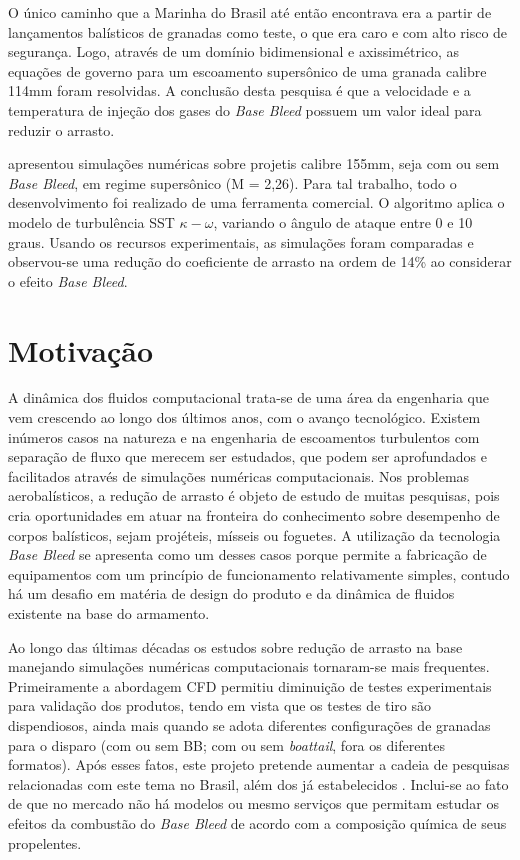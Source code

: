 O único caminho que a Marinha do Brasil até então encontrava era a partir de lançamentos balísticos de granadas como teste, o que era caro e com alto risco de segurança. Logo, através de um domínio bidimensional e axissimétrico, as equações de governo para um escoamento supersônico de uma granada calibre 114mm foram resolvidas. A conclusão desta pesquisa é que a velocidade e a temperatura de injeção dos gases do \textit{Base Bleed} possuem um valor ideal para reduzir o arrasto.

\citeauthor{Reddy2021} apresentou simulações numéricas sobre projetis calibre 155mm, seja com ou sem \textit{Base Bleed}, em regime supersônico (M = 2,26). Para tal trabalho, todo o desenvolvimento foi realizado de uma ferramenta comercial. O algoritmo aplica o modelo de turbulência SST $\kappa-\omega$, variando o ângulo de ataque entre 0 e 10 graus. Usando os recursos experimentais, as simulações foram comparadas e observou-se uma redução do coeficiente de arrasto na ordem de 14\% ao considerar o efeito \textit{Base Bleed}. 

\section{Motivação}

A dinâmica dos fluidos computacional trata-se de uma área da engenharia que vem crescendo ao longo dos últimos anos, com o avanço tecnológico. Existem inúmeros casos na natureza e na engenharia de escoamentos turbulentos com separação de fluxo que merecem ser estudados, que podem ser aprofundados e facilitados através de simulações numéricas computacionais. Nos problemas aerobalísticos, a redução de arrasto é objeto de estudo de muitas pesquisas, pois cria oportunidades em atuar na fronteira do conhecimento sobre desempenho de corpos balísticos, sejam projéteis, mísseis ou foguetes. A utilização da tecnologia \textit{Base Bleed} se apresenta como um desses casos porque permite a fabricação de equipamentos com um princípio de funcionamento relativamente simples, contudo há um desafio em matéria de design do produto e da dinâmica de fluidos existente na base do armamento.

Ao longo das últimas décadas os estudos sobre redução de arrasto na base manejando simulações numéricas computacionais tornaram-se mais frequentes. Primeiramente a abordagem CFD permitiu diminuição de testes experimentais para validação dos produtos, tendo em vista que os testes de tiro são dispendiosos, ainda mais quando se adota diferentes configurações de granadas para o disparo (com ou sem BB; com ou sem \textit{boattail}, fora os diferentes formatos). Após esses fatos, este projeto pretende aumentar a cadeia de pesquisas relacionadas com este tema no Brasil, além dos já estabelecidos \cite{Lucena2020, Rosendo2020, Gil2020}. Inclui-se ao fato de que no mercado não há modelos ou mesmo serviços que permitam estudar os efeitos da combustão do \textit{Base Bleed} de acordo com a composição química de seus propelentes. 
	
